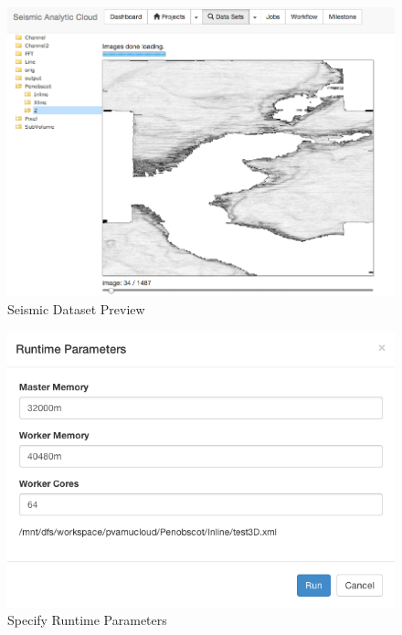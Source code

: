 \begin{figure}[h]
\centering
\includegraphics[scale=.45]{figures/DataSet.png}
\caption{Seismic Dataset Preview}
\label{DataSet}
\end{figure}

\begin{figure}[h]
\centering
\includegraphics[scale=.60]{figures/Runtime.png}
\caption{Specify Runtime Parameters}
\label{Runtime}
\end{figure}


